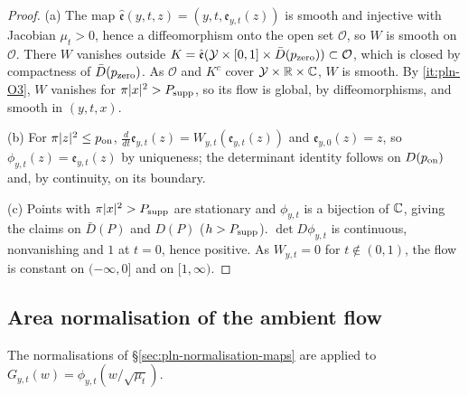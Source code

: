 \begin{proof}
(a) The map $\hat{\mathfrak e}(y,t,z)=(y,t,\mathfrak e_{y,t}(z))$ is smooth and injective with Jacobian $\mu_t>0$, hence a diffeomorphism onto the open set $\mathcal O$, so $W$ is smooth on $\mathcal O$. There $W$ vanishes outside $K=\hat{\mathfrak e}(\mathcal Y\times[0,1]\times\bar D(p_{\rm zero}))\subset\mathcal O$, which is closed by compactness of $\bar D(p_{\rm zero})$. As $\mathcal O$ and $K^c$ cover $\mathcal Y\times\mathbb{R}\times\mathbb{C}$, $W$ is smooth. By \ref{it:pln-O3}, $W$ vanishes for $\pi|x|^2>P_{\rm supp}$, so its flow is global, by diffeomorphisms, and smooth in $(y,t,x)$.

(b) For $\pi|z|^2\le p_{\rm on}$, $\frac d{dt}\mathfrak e_{y,t}(z)=W_{y,t}(\mathfrak e_{y,t}(z))$ and $\mathfrak e_{y,0}(z)=z$, so $\phi_{y,t}(z)=\mathfrak e_{y,t}(z)$ by uniqueness; the determinant identity follows on $D(p_{\rm on})$ and, by continuity, on its boundary.

(c) Points with $\pi|x|^2>P_{\rm supp}$ are stationary and $\phi_{y,t}$ is a bijection of $\mathbb{C}$, giving the claims on $\bar D(P)$ and $D(P)$ ($h>P_{\rm supp}$). $\det D\phi_{y,t}$ is continuous, nonvanishing and $1$ at $t=0$, hence positive. As $W_{y,t}=0$ for $t\notin(0,1)$, the flow is constant on $(-\infty,0]$ and on $[1,\infty)$.
\end{proof}

\subsection{Area normalisation of the ambient flow}\label{sec:pln-normal}

The normalisations of \S\ref{sec:pln-normalisation-maps} are applied to $G_{y,t}(w)=\phi_{y,t}(w/\sqrt{\mu_t})$.

